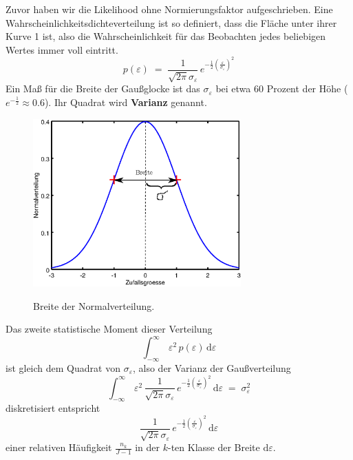 \documentclass[a4paper,12pt,DIV=15]{scrartcl}
\begin{document}
Zuvor haben wir die Likelihood ohne Normierungsfaktor aufgeschrieben.
Eine Wahrscheinlichkeitsdichteverteilung ist so definiert, dass die Fläche unter ihrer Kurve 1 ist, also die Wahrscheinlichkeit
für das Beobachten jedes beliebigen Wertes immer voll eintritt.
\begin{equation}
p(\varepsilon) \; = \; \frac{1}{\sqrt{2 \pi} \sigma_{\varepsilon}} \, e^{-\frac{1}{2} \left(\frac{\varepsilon}{\sigma_{\varepsilon}}\right)^2}
\end{equation}
Ein Maß für die Breite der Gaußglocke ist das $\sigma_{\varepsilon}$ bei etwa 60 Prozent der Höhe ($e^{-\frac{1}{2}} \approx 0.6$).
Ihr Quadrat wird \textbf{Varianz} genannt.
\begin{figure}
\begin{center}
\includegraphics[width=80mm]{media/breite_norm_pdf.eps}
\label{normpdf}
\caption{Breite der Normalverteilung.}
\end{center}
\end{figure}
Das zweite statistische Moment dieser Verteilung 
\begin{equation}
\int_{-\infty}^\infty \, \varepsilon^2 \, p(\varepsilon) \, \mathrm{d} \varepsilon 
\end{equation}
ist gleich dem Quadrat von $\sigma_\varepsilon$, also der Varianz der Gaußverteilung
\begin{equation}
\int_{-\infty}^\infty \, \varepsilon^2 \,  \frac{1}{\sqrt{2 \pi} \sigma_{\varepsilon}} \, e^{-\frac{1}{2} \left(\frac{\varepsilon}{\sigma_\varepsilon}\right)^2} \, \mathrm{d} \varepsilon  \; = \; \sigma_{\varepsilon}^2
\end{equation}
diskretisiert entspricht
\begin{equation}
\frac{1}{\sqrt{2 \pi} \sigma_\varepsilon} \, e^{-\frac{1}{2} \left(\frac{\varepsilon}{\sigma_{\varepsilon}}\right)^2} \, \mathrm{d} \varepsilon
\end{equation}
einer relativen Häufigkeit $\frac{n_k}{J-1}$ in der $k$-ten Klasse der Breite $\mathrm{d} \varepsilon$.
\end{document}
